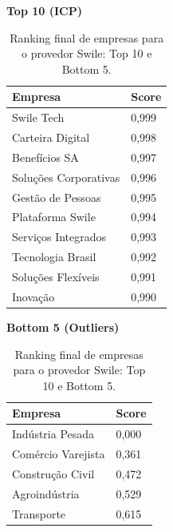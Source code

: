 \begin{table}[p]
    \centering
    \caption{Ranking final de empresas para o provedor Swile: Top 10 e Bottom 5.}
    \label{tab:7_6_ranking_swile}
    \begin{minipage}{0.48\textwidth}
    \centering
    \textbf{Top 10 (ICP)}\\
    \begin{tabular}{p{5cm}p{1.8cm}}
    \toprule
    Empresa & Score \\
    \midrule
    Swile Tech & 0,999 \\
    Carteira Digital & 0,998 \\
    Benefícios SA & 0,997 \\
    Soluções Corporativas & 0,996 \\
    Gestão de Pessoas & 0,995 \\
    Plataforma Swile & 0,994 \\
    Serviços Integrados & 0,993 \\
    Tecnologia Brasil & 0,992 \\
    Soluções Flexíveis & 0,991 \\
    Inovação & 0,990 \\
    \bottomrule
    \end{tabular}
    \end{minipage}\hfill
    \begin{minipage}{0.48\textwidth}
    \centering
    \textbf{Bottom 5 (Outliers)}\\
    \begin{tabular}{p{5cm}p{1.8cm}}
    \toprule
    Empresa & Score \\
    \midrule
    Indústria Pesada & 0,000 \\
    Comércio Varejista & 0,361 \\
    Construção Civil & 0,472 \\
    Agroindústria & 0,529 \\
    Transporte & 0,615 \\
    \bottomrule
    \end{tabular}
    \end{minipage}
\end{table}

